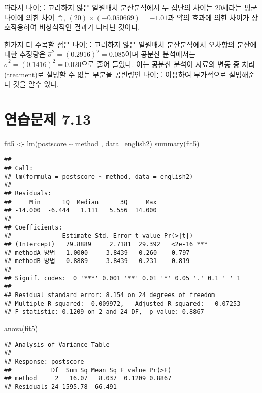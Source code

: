 \documentclass[
]{book}
\newenvironment{Shaded}{\begin{snugshade}}{\end{snugshade}}
\newcommand{\AttributeTok}[1]{\textcolor[rgb]{0.77,0.63,0.00}{#1}}
\newcommand{\FunctionTok}[1]{\textcolor[rgb]{0.00,0.00,0.00}{#1}}
\newcommand{\NormalTok}[1]{#1}
\newcommand{\OtherTok}[1]{\textcolor[rgb]{0.56,0.35,0.01}{#1}}
\newcommand{\SpecialCharTok}[1]{\textcolor[rgb]{0.00,0.00,0.00}{#1}}
\begin{document}
따라서 나이를 고려하지 않은 일원배치 분산분석에서
두 집단의 차이는 20세라는 평균 나이에 의한 차이 즉, \((20) \times (-0.050669)= -1.01\)과 약의 효과에 의한 차이가 상호작용하여 비상식적인 결과가 나타난 것이다.

한가지 더 주목할 점은 나이를 고려하지 않은 일원배치 분산분석에서 오차항의 분산에 대한 추정량은
\(\hat \sigma^2 = (0.2916)^2 =0.085\)이며 공분산 분석에서는 \(\hat \sigma^2 = (0.1416)^2 =0.020\)으로
줄어 들었다. 이는 공분산 분석이 자료의 변동 중 처리(treament)로 설명할 수 없는 부분을 공변량인 나이를 이용하여 부가적으로 설명해준다 것을 알수 있다.

\hypertarget{uxc5f0uxc2b5uxbb38uxc81c-7.13}{%
\section{연습문제 7.13}\label{uxc5f0uxc2b5uxbb38uxc81c-7.13}}

\begin{Shaded}
\begin{Highlighting}[]
\NormalTok{fit5 }\OtherTok{\textless{}{-}} \FunctionTok{lm}\NormalTok{(postscore }\SpecialCharTok{\textasciitilde{}}\NormalTok{ method , }\AttributeTok{data=}\NormalTok{english2)}
\FunctionTok{summary}\NormalTok{(fit5)}
\end{Highlighting}
\end{Shaded}

\begin{verbatim}
## 
## Call:
## lm(formula = postscore ~ method, data = english2)
## 
## Residuals:
##     Min      1Q  Median      3Q     Max 
## -14.000  -6.444   1.111   5.556  14.000 
## 
## Coefficients:
##              Estimate Std. Error t value Pr(>|t|)    
## (Intercept)   79.8889     2.7181  29.392   <2e-16 ***
## methodA 방법   1.0000     3.8439   0.260    0.797    
## methodB 방법  -0.8889     3.8439  -0.231    0.819    
## ---
## Signif. codes:  0 '***' 0.001 '**' 0.01 '*' 0.05 '.' 0.1 ' ' 1
## 
## Residual standard error: 8.154 on 24 degrees of freedom
## Multiple R-squared:  0.009972,   Adjusted R-squared:  -0.07253 
## F-statistic: 0.1209 on 2 and 24 DF,  p-value: 0.8867
\end{verbatim}

\begin{Shaded}
\begin{Highlighting}[]
\FunctionTok{anova}\NormalTok{(fit5)}
\end{Highlighting}
\end{Shaded}

\begin{verbatim}
## Analysis of Variance Table
## 
## Response: postscore
##           Df  Sum Sq Mean Sq F value Pr(>F)
## method     2   16.07   8.037  0.1209 0.8867
## Residuals 24 1595.78  66.491
\end{verbatim}
\end{document}
